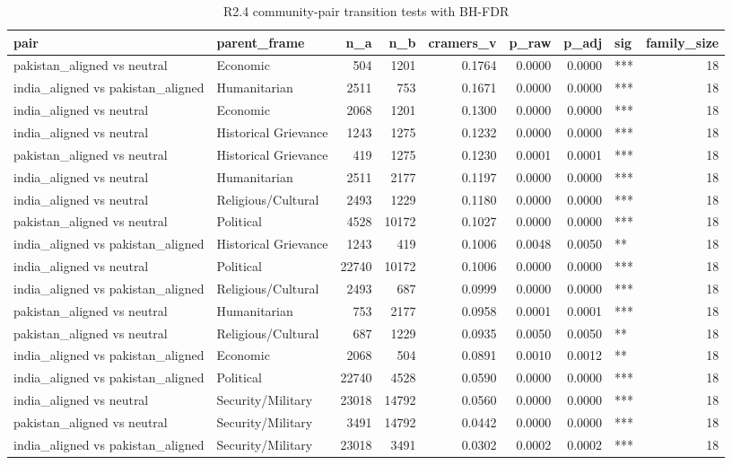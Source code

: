 \begin{table}
\caption{R2.4 community-pair transition tests with BH-FDR}
\label{tab:r1r2_community_pair_tests}
\begin{tabular}{llrrrrrlr}
\toprule
pair & parent\_frame & n\_a & n\_b & cramers\_v & p\_raw & p\_adj & sig & family\_size \\
\midrule
pakistan\_aligned vs neutral & Economic & 504 & 1201 & 0.1764 & 0.0000 & 0.0000 & *** & 18 \\
india\_aligned vs pakistan\_aligned & Humanitarian & 2511 & 753 & 0.1671 & 0.0000 & 0.0000 & *** & 18 \\
india\_aligned vs neutral & Economic & 2068 & 1201 & 0.1300 & 0.0000 & 0.0000 & *** & 18 \\
india\_aligned vs neutral & Historical Grievance & 1243 & 1275 & 0.1232 & 0.0000 & 0.0000 & *** & 18 \\
pakistan\_aligned vs neutral & Historical Grievance & 419 & 1275 & 0.1230 & 0.0001 & 0.0001 & *** & 18 \\
india\_aligned vs neutral & Humanitarian & 2511 & 2177 & 0.1197 & 0.0000 & 0.0000 & *** & 18 \\
india\_aligned vs neutral & Religious/Cultural & 2493 & 1229 & 0.1180 & 0.0000 & 0.0000 & *** & 18 \\
pakistan\_aligned vs neutral & Political & 4528 & 10172 & 0.1027 & 0.0000 & 0.0000 & *** & 18 \\
india\_aligned vs pakistan\_aligned & Historical Grievance & 1243 & 419 & 0.1006 & 0.0048 & 0.0050 & ** & 18 \\
india\_aligned vs neutral & Political & 22740 & 10172 & 0.1006 & 0.0000 & 0.0000 & *** & 18 \\
india\_aligned vs pakistan\_aligned & Religious/Cultural & 2493 & 687 & 0.0999 & 0.0000 & 0.0000 & *** & 18 \\
pakistan\_aligned vs neutral & Humanitarian & 753 & 2177 & 0.0958 & 0.0001 & 0.0001 & *** & 18 \\
pakistan\_aligned vs neutral & Religious/Cultural & 687 & 1229 & 0.0935 & 0.0050 & 0.0050 & ** & 18 \\
india\_aligned vs pakistan\_aligned & Economic & 2068 & 504 & 0.0891 & 0.0010 & 0.0012 & ** & 18 \\
india\_aligned vs pakistan\_aligned & Political & 22740 & 4528 & 0.0590 & 0.0000 & 0.0000 & *** & 18 \\
india\_aligned vs neutral & Security/Military & 23018 & 14792 & 0.0560 & 0.0000 & 0.0000 & *** & 18 \\
pakistan\_aligned vs neutral & Security/Military & 3491 & 14792 & 0.0442 & 0.0000 & 0.0000 & *** & 18 \\
india\_aligned vs pakistan\_aligned & Security/Military & 23018 & 3491 & 0.0302 & 0.0002 & 0.0002 & *** & 18 \\
\bottomrule
\end{tabular}
\end{table}
